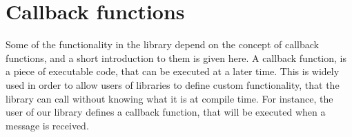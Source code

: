 \section{Callback functions}
Some of the functionality in the library depend on the concept of callback functions, and a short introduction to them is given here.
A callback function, is a piece of executable code, that can be executed at a later time. This is widely used in order to allow users of libraries to define custom functionality, that the library can call without knowing what it is at compile time. For instance, the user of our library defines a callback function, that will be executed when a message is received.
